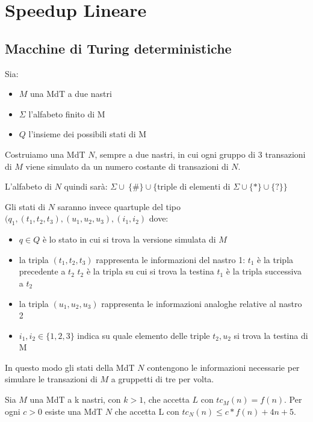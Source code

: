 \section{Speedup Lineare}

\subsection{Macchine di Turing deterministiche}

Sia:
\begin{itemize}
	\item $M$ una MdT a due nastri
	\item $\Sigma$ l'alfabeto finito di M
	\item $Q$ l'insieme dei possibili stati di M
\end{itemize}

Costruiamo una MdT $N$, sempre a due nastri, in cui ogni gruppo di 3 transazioni di $M$ viene simulato da un numero costante di transazioni di $N$.

L'alfabeto di $N$ quindi sarà: $ \Sigma \cup \ \{\#\} \cup \{ \text{triple di elementi di } \Sigma \cup \{\ast\} \cup \{?\} \} $

Gli stati di $N$ saranno invece quartuple del tipo $(q_1, (t_1, t_2, t_3), (u_1, u_2, u_3), (i_1, i_2)$ dove:

\begin{itemize}
	\item $q \in Q$ è lo stato in cui si trova la versione simulata di $M$
	\item la tripla $(t_1, t_2, t_3)$ rappresenta le informazioni del nastro 1:
		\subitem $t_1$ è la tripla precedente a $t_2$
		\subitem $t_2$ è la tripla su cui si trova la testina
		\subitem $t_1$ è la tripla successiva a $t_2$
	\item la tripla $(u_1, u_2, u_3)$ rappresenta le informazioni analoghe relative al nastro 2
	\item $i_1, i_2 \in \{1, 2, 3\}$ indica su quale elemento delle triple $t_2, u_2$ si trova la testina di M
\end{itemize}

In questo modo gli stati della MdT $N$ contengono le informazioni necessarie per simulare le transazioni di $M$ a gruppetti di tre per volta. \\

\begin{lemm}
	Sia $M$ una MdT a k nastri, con $k > 1$, che accetta $L$ con $tc_M(n) = f(n)$.
	Per ogni $c > 0$ esiste una MdT $N$ che accetta L con $tc_N(n) \leq c*f(n) + 4n + 5$.
\end{lemm}

